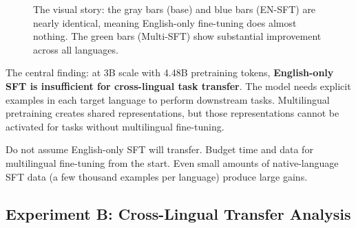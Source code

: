 \documentclass[11pt,a4paper]{article}
\begin{document}
\begin{figure}[H]
\centering
{}
\caption{The visual story: the gray bars (base) and blue bars (EN-SFT) are nearly identical, meaning English-only fine-tuning does almost nothing. The green bars (Multi-SFT) show substantial improvement across all languages.}
\label{fig:results_sentiment}
\end{figure}

\begin{keyidea}
The central finding: at 3B scale with 4.48B pretraining tokens, \textbf{English-only SFT is insufficient for cross-lingual task transfer}. The model needs explicit examples in each target language to perform downstream tasks. Multilingual pretraining creates shared representations, but those representations cannot be activated for tasks without multilingual fine-tuning.
\end{keyidea}

\begin{tip}[title={Builder Takeaway}]
Do not assume English-only SFT will transfer. Budget time and data for multilingual fine-tuning from the start. Even small amounts of native-language SFT data (a few thousand examples per language) produce large gains.
\end{tip}

\subsection{Experiment B: Cross-Lingual Transfer Analysis}
\end{document}
